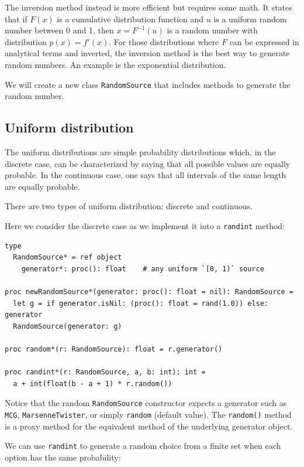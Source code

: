 \documentclass[justified, sixbynine]{tufte-book}
\def\ft{\small\tt}
\theoremstyle{plain}%
\newtheorem * {corollary}{Corollary}
\theoremstyle{definition}
\theoremstyle{remark}
\newtheorem * {remark}{Remark}
\newtheorem * {note}{Note}
\begin{document}
\begin{fullwidth}
The inversion method instead is more efficient but requires some math. It states that if $F(x)$ is a cumulative distribution function and $u$ is a uniform random number between 0 and 1, then $x = F^{-1}(u)$ is a random number with distribution $p(x)=f'(x)$. For those distributions where $F$ can be expressed in analytical terms and inverted, the inversion method is the best way to generate random numbers. An example is the exponential distribution.

We will create a new class {\ft RandomSource} that includes methods to generate the random number.

\goodbreak\subsection{Uniform distribution}

The uniform distributions are simple probability distributions which, in the
discrete case, can be characterized by saying that all possible values are
equally probable. In the continuous case, one says that all intervals of the
same length are equally probable.

There are two types of uniform distribution: discrete and continuous.

Here we consider the discrete case as we implement it into a {\ft randint} method:


\begin{lstlisting}[caption={in file: {\ft nlib/randomgen.nim}}]
type
  RandomSource* = ref object
    generator*: proc(): float    # any uniform `[0, 1)` source

proc newRandomSource*(generator: proc(): float = nil): RandomSource =
  let g = if generator.isNil: (proc(): float = rand(1.0)) else: generator
  RandomSource(generator: g)

proc random*(r: RandomSource): float = r.generator()

proc randint*(r: RandomSource, a, b: int): int =
  a + int(float(b - a + 1) * r.random())
\end{lstlisting}

Notice that the random {\ft RandomSource} constructor expects a generator such as {\ft MCG}, {\ft MarsenneTwister}, or simply {\ft random} (default value). The {\ft random()} method is a proxy method for the equivalent method of the underlying generator object.

We can use {\ft randint} to generate a random choice from a finite set when each option has the same probability:


\end{fullwidth}
\end{document}
